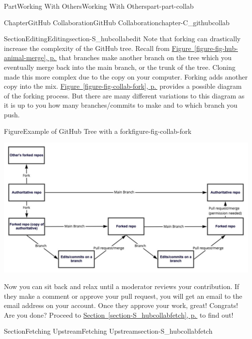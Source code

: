 \documentclass[twoside,10pt,]{book}
\newcommand{\xreffont}{\relax}
\begin{document}
\begin{partptx}{Part}{Working With Others}{}{Working With Others}{}{}{part-part-collab}
\begin{chapterptx}{Chapter}{GitHub Collaboration}{}{GitHub Collaboration}{}{}{chapter-C_githubcollab}
\begin{sectionptx}{Section}{Editing}{}{Editing}{}{}{section-S_hubcollabedit}
Note that forking can drastically increase the complexity of the GitHub tree. Recall from \hyperref[figure-fig-hub-animal-merge]{Figure~{\xreffont\ref{figure-fig-hub-animal-merge}}, p.\,\pageref{figure-fig-hub-animal-merge}} that branches make another branch on the tree which you eventually merge back into the main branch, or the trunk of the tree. Cloning made this more complex due to the copy on your computer. Forking adds another copy into the mix. \hyperref[figure-fig-collab-fork]{Figure~{\xreffont\ref{figure-fig-collab-fork}}, p.\,\pageref{figure-fig-collab-fork}} provides a possible diagram of the forking process. But there are many different variations to this diagram as it is up to you how many branches\slash{}commits to make and to which branch you push.%
\begin{figureptx}{Figure}{Example of GitHub Tree with a fork}{figure-fig-collab-fork}{}%
\begin{image}{0.025}{0.95}{0.025}{}%
\includegraphics[width=\linewidth]{external/collab_fork.pdf}
\end{image}%
\tcblower
\end{figureptx}%
Now you can sit back and relax until a moderator reviews your contribution. If they make a comment or approve your pull request, you will get an email to the email address on your account. Once they approve your work, great! Congrats! Are you done? Proceed to \hyperref[section-S_hubcollabfetch]{Section~{\xreffont\ref{section-S_hubcollabfetch}}, p.\,\pageref{section-S_hubcollabfetch}} to find out!%
\end{sectionptx}
%
%
\typeout{************************************************}
\typeout{************************************************}
%
\begin{sectionptx}{Section}{Fetching Upstream}{}{Fetching Upstream}{}{}{section-S_hubcollabfetch}

\end{sectionptx}
\end{chapterptx}
\end{partptx}
\end{document}
